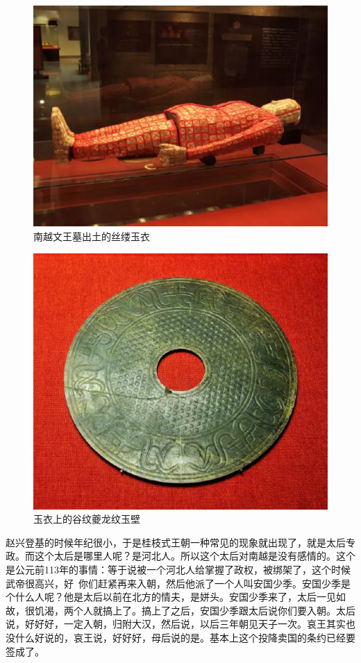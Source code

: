 \begin{figure}
	\centering
	\includegraphics[width=\textwidth]{images/image-10}
	\caption{南越文王墓出土的丝缕玉衣}
\end{figure}

\begin{figure}
	\centering
	\includegraphics[width=\textwidth]{images/image-12}
	\caption{玉衣上的谷纹夔龙纹玉壁}
\end{figure}

赵兴登基的时候年纪很小，于是桂枝式王朝一种常见的现象就出现了，就是太后专政。而这个太后是哪里人呢？是河北人。所以这个太后对南越是没有感情的。这个是公元前113年的事情：等于说被一个河北人给掌握了政权，被绑架了，这个时候武帝很高兴，好~你们赶紧再来入朝，然后他派了一个人叫安国少季。安国少季是个什么人呢？他是太后以前在北方的情夫，是姘头。安国少季来了，太后一见如故，很饥渴，两个人就搞上了。搞上了之后，安国少季跟太后说你们要入朝。太后说，好好好，一定入朝，归附大汉，然后说，以后三年朝见天子一次。哀王其实也没什么好说的，哀王说，好好好，母后说的是。基本上这个投降卖国的条约已经要签成了。

